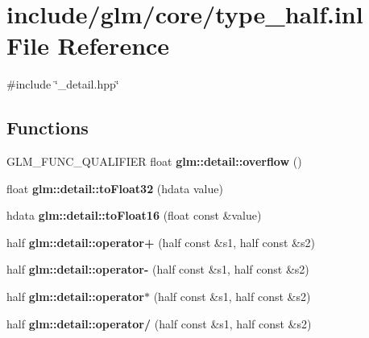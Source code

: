 \hypertarget{type__half_8inl}{\section{include/glm/core/type\-\_\-half.inl \-File \-Reference}
\label{type__half_8inl}
}
{\ttfamily \#include \char`\"{}\-\_\-detail.\-hpp\char`\"{}}\*
\subsection*{\-Functions}
\begin{DoxyCompactItemize}
\item 
\hypertarget{namespaceglm_1_1detail_a61efe122333bc00e81c57e0927bfdfb3}{\-G\-L\-M\-\_\-\-F\-U\-N\-C\-\_\-\-Q\-U\-A\-L\-I\-F\-I\-E\-R float {\bfseries glm\-::detail\-::overflow} ()}\label{namespaceglm_1_1detail_a61efe122333bc00e81c57e0927bfdfb3}

\item 
\hypertarget{namespaceglm_1_1detail_a8e4719d94d99ee1e625496e04317272b}{float {\bfseries glm\-::detail\-::to\-Float32} (hdata value)}\label{namespaceglm_1_1detail_a8e4719d94d99ee1e625496e04317272b}

\item 
\hypertarget{namespaceglm_1_1detail_ac16321696a34b41c55f941b319d50652}{hdata {\bfseries glm\-::detail\-::to\-Float16} (float const \&value)}\label{namespaceglm_1_1detail_ac16321696a34b41c55f941b319d50652}

\item 
\hypertarget{namespaceglm_1_1detail_a2156d538bd360f2cf8eb0259ffd0fcee}{half {\bfseries glm\-::detail\-::operator+} (half const \&s1, half const \&s2)}\label{namespaceglm_1_1detail_a2156d538bd360f2cf8eb0259ffd0fcee}

\item 
\hypertarget{namespaceglm_1_1detail_a95c2e07ba4e13b8ae23147b76624500b}{half {\bfseries glm\-::detail\-::operator-\/} (half const \&s1, half const \&s2)}\label{namespaceglm_1_1detail_a95c2e07ba4e13b8ae23147b76624500b}

\item 
\hypertarget{namespaceglm_1_1detail_a02505d56c5e061fa54725f153fca6160}{half {\bfseries glm\-::detail\-::operator$\ast$} (half const \&s1, half const \&s2)}\label{namespaceglm_1_1detail_a02505d56c5e061fa54725f153fca6160}

\item 
\hypertarget{namespaceglm_1_1detail_a1e1744732d76d7cdc5cbc0eb22a516f5}{half {\bfseries glm\-::detail\-::operator/} (half const \&s1, half const \&s2)}\label{namespaceglm_1_1detail_a1e1744732d76d7cdc5cbc0eb22a516f5}


\end{DoxyCompactItemize}
